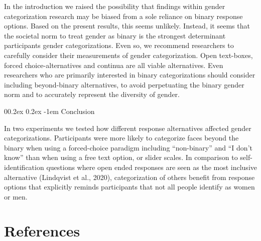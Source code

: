 \documentclass[
  man]{apa7}
\makeatletter
\let\oldparagraph\paragraph
\renewcommand{\paragraph}[1]{\oldparagraph{#1}\mbox{}}
\renewcommand{\paragraph}{\@startsection{paragraph}{4}{\parindent}%
  {0\baselineskip \@plus 0.2ex \@minus 0.2ex}%
  {-1em}%
  {\normalfont\normalsize\bfseries\itshape\typesectitle}}
\renewcommand{\paragraph}{\@startsection{paragraph}{4}{\parindent}%
  {0\baselineskip \@plus 0.2ex \@minus 0.2ex}%
  {-1em}%
  {\normalfont\normalsize\bfseries\typesectitle}}
\makeatother
\begin{document}
In the introduction we raised the possibility that findings within gender categorization research may be biased from a sole reliance on binary response options. Based on the present results, this seems unlikely. Instead, it seems that the societal norm to treat gender as binary is the strongest determinant participants gender categorizations. Even so, we recommend researchers to carefully consider their measurements of gender categorization. Open text-boxes, forced choice-alternatives and continua are all viable alternatives. Even researchers who are primarily interested in binary categorizations should consider including beyond-binary alternatives, to avoid perpetuating the binary gender norm and to accurately represent the diversity of gender.

\hypertarget{conclusion}{%
\paragraph{Conclusion}\label{conclusion}}

In two experiments we tested how different response alternatives affected gender categorizations. Participants were more likely to categorize faces beyond the binary when using a forced-choice paradigm including ``non-binary'' and ``I don't know'' than when using a free text option, or slider scales. In comparison to self-identification questions where open ended responses are seen as the most inclusive alternative (Lindqvist et al., 2020), categorization of others benefit from response options that explicitly reminds participants that not all people identify as women or men.

\newpage

\hypertarget{references}{%
\section{References}\label{references}}
\end{document}
